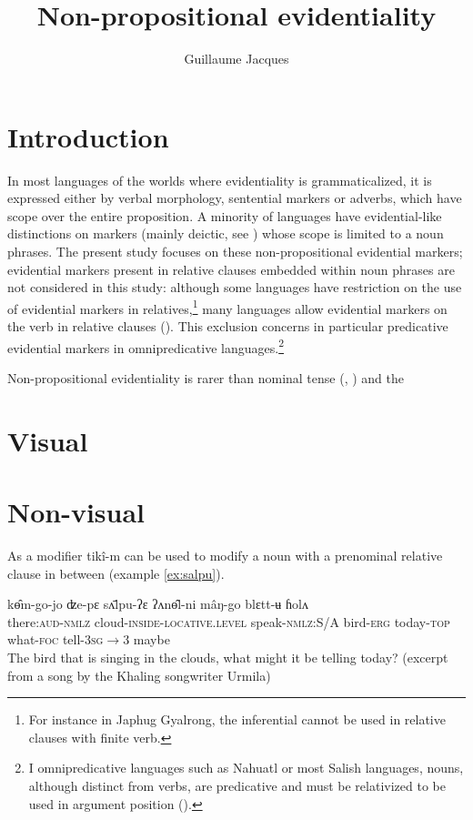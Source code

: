 \documentclass[oneside,a4paper,11pt]{article}
\newcommand{\ipa}[1]{{\phon \mbox{#1}}} %
\begin{document}
 
\linenumbers

\title{Non-propositional evidentiality}
\author{Guillaume Jacques}
\maketitle

\section{Introduction}
In most languages of the worlds where evidentiality is grammaticalized, it is expressed either by verbal morphology, sentential markers or adverbs, which have scope over the entire proposition. A minority of languages have evidential-like distinctions on markers (mainly deictic, see \citealt[130]{aikhenvald06}) whose scope is limited to a noun phrases. The present study focuses on these non-propositional evidential markers; evidential markers present in relative clauses embedded within noun phrases are not considered in this study: although some languages have restriction on the use of evidential markers in relatives,\footnote{For instance in Japhug Gyalrong, the inferential cannot be used in relative clauses with finite verb.} many languages allow evidential markers on the verb in relative clauses (\citealt[253-6]{aikhenvald06}). This exclusion concerns in particular predicative evidential markers in omnipredicative languages.\footnote{I omnipredicative languages such as Nahuatl or most Salish languages, nouns, although distinct from verbs, are predicative and must be relativized to be used in argument position (\citealt{launey94}).}

 Non-propositional evidentiality is rarer than nominal tense (\citet{nordlinger04nominal}, \citealt[132]{francois05overview}) and the 

\section{Visual}

\section{Non-visual}
As a modifier \ipa{tikî-m} can be used to modify   a noun with a prenominal     relative clause  in between (example \ref{ex:salpu}).

\begin{exe}
\ex \label{ex:salpu}
\gll    	 	\ipa{tikî-m}   	\ipa{kɵ̂m-go-jo}   	\ipa{ʣe-pɛ}   	\ipa{sʌ̄lpu-ʔɛ}   	\ipa{ʔʌnɵ̂l-ni}   	\ipa{mâŋ-go}   	\ipa{blɛtt-ʉ}   	\ipa{ɦolʌ}   
 \\
 there:\textsc{aud}-\textsc{nmlz} cloud-\textsc{inside-locative.level} speak-\textsc{nmlz:}S/A bird-\textsc{erg} today-\textsc{top} what-\textsc{foc} tell-\textsc{3sg$\rightarrow$3} maybe \\
\glt The bird that is singing in the clouds, what might it be telling today? (excerpt from a song by the Khaling songwriter Urmila)
\end{exe}
 
\end{document}
